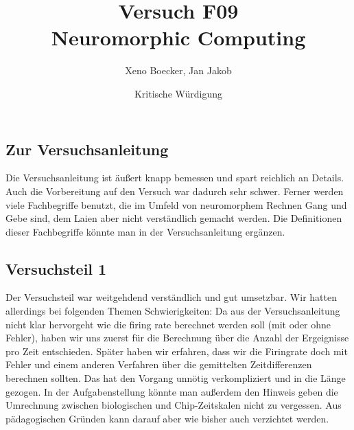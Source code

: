 \documentclass[10pt,a4paper]{scrartcl}
\title{Versuch F09\\ Neuromorphic Computing}
\date{Kritische Würdigung}
\author{Xeno Boecker, Jan Jakob}
\begin{document}

\thispagestyle{empty}  %
 \maketitle



\newpage




\subsection*{Zur Versuchsanleitung}
Die Versuchsanleitung ist äußert knapp bemessen und spart reichlich an Details. Auch die Vorbereitung auf den Versuch war dadurch sehr schwer. Ferner werden viele Fachbegriffe benutzt, die im Umfeld von neuromorphem Rechnen Gang und Gebe sind, dem Laien aber nicht verständlich gemacht werden. Die Definitionen dieser Fachbegriffe könnte man in der Versuchsanleitung ergänzen.

\subsection*{Versuchsteil 1}
Der Versuchsteil war weitgehdend verständlich und gut umsetzbar. Wir hatten allerdings bei folgenden Themen Schwierigkeiten: Da aus der Versuchsanleitung nicht klar hervorgeht wie die firing rate berechnet werden soll (mit oder ohne Fehler), haben wir uns zuerst für die Berechnung über die Anzahl der Ergeignisse pro Zeit entschieden. Später haben wir erfahren, dass wir die Firingrate doch mit Fehler und einem anderen Verfahren über die gemittelten Zeitdifferenzen berechnen sollten. Das hat den Vorgang unnötig verkompliziert und in die Länge gezogen. In der Aufgabenstellung könnte man außerdem den Hinweis geben die Umrechnung zwischen biologischen und Chip-Zeitskalen nicht zu vergessen. Aus pädagogischen Gründen kann darauf aber wie bisher auch verzichtet werden.
\end{document}
